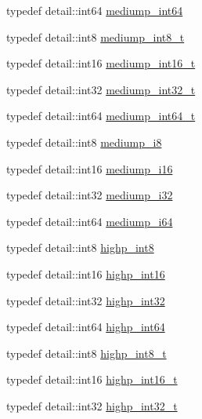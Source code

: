 \begin{DoxyCompactItemize}
\item 
typedef detail\-::int64 \hyperlink{group__gtc__type__precision_ga603c695fe5cd677d3f72a81343e19a74}{mediump\-\_\-int64}
\item 
typedef detail\-::int8 \hyperlink{group__gtc__type__precision_ga626ac5f73d3538e62a879d6c56abfb36}{mediump\-\_\-int8\-\_\-t}
\item 
typedef detail\-::int16 \hyperlink{group__gtc__type__precision_ga478fab608cf43040013d719a3e03b194}{mediump\-\_\-int16\-\_\-t}
\item 
typedef detail\-::int32 \hyperlink{group__gtc__type__precision_gafd9b4bd9e4465aec63351b59100692c4}{mediump\-\_\-int32\-\_\-t}
\item 
typedef detail\-::int64 \hyperlink{group__gtc__type__precision_ga555a2f85641550c232db473a9bb981f7}{mediump\-\_\-int64\-\_\-t}
\item 
typedef detail\-::int8 \hyperlink{group__gtc__type__precision_ga28a8b5fd51072680bb55178c17cc7411}{mediump\-\_\-i8}
\item 
typedef detail\-::int16 \hyperlink{group__gtc__type__precision_ga8454fc6a82c7bb787d0ac9663e08f63d}{mediump\-\_\-i16}
\item 
typedef detail\-::int32 \hyperlink{group__gtc__type__precision_ga5e00ec824eb55968a6b6496f294d8c07}{mediump\-\_\-i32}
\item 
typedef detail\-::int64 \hyperlink{group__gtc__type__precision_ga90fedf6c701ffbe00535156715e50787}{mediump\-\_\-i64}
\item 
typedef detail\-::int8 \hyperlink{group__gtc__type__precision_ga57c86999e666760c304453f9bfdc09d1}{highp\-\_\-int8}
\item 
typedef detail\-::int16 \hyperlink{group__gtc__type__precision_gaf0430ed80e88c0d1dfbe47f359659c81}{highp\-\_\-int16}
\item 
typedef detail\-::int32 \hyperlink{group__gtc__type__precision_gaa2045c92b9553d463191af6a20e997bb}{highp\-\_\-int32}
\item 
typedef detail\-::int64 \hyperlink{group__gtc__type__precision_ga7ffb27943e9569800979081bc548621c}{highp\-\_\-int64}
\item 
typedef detail\-::int8 \hyperlink{group__gtc__type__precision_ga417701b99e6e7992f35ab2ef694f88b2}{highp\-\_\-int8\-\_\-t}
\item 
typedef detail\-::int16 \hyperlink{group__gtc__type__precision_ga07d318d61472e75238e53b9642227672}{highp\-\_\-int16\-\_\-t}
\item 
typedef detail\-::int32 \hyperlink{group__gtc__type__precision_ga783d077a513c1f475f6cdb406b4238c3}{highp\-\_\-int32\-\_\-t}

\end{DoxyCompactItemize}
